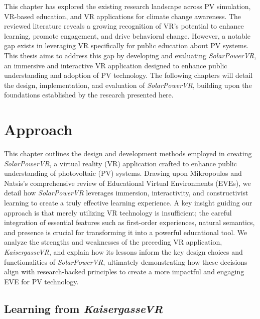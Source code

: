 \documentclass[draft, final]{vutinfth} %
\begin{document}
This chapter has explored the existing research landscape across PV simulation, VR-based education, and VR applications for climate change awareness. The reviewed literature reveals a growing recognition of VR's potential to enhance learning, promote engagement, and drive behavioral change. However, a notable gap exists in leveraging VR specifically for public education about PV systems. This thesis aims to address this gap by developing and evaluating \textit{SolarPowerVR}, an immersive and interactive VR application designed to enhance public understanding and adoption of PV technology. The following chapters will detail the design, implementation, and evaluation of \textit{SolarPowerVR}, building upon the foundations established by the research presented here.

\chapter{Approach}
\label{cpt:approach}

This chapter outlines the design and development methods employed in creating \textit{SolarPowerVR}, a virtual reality (VR) application crafted to enhance public understanding of photovoltaic (PV) systems. Drawing upon Mikropoulos and Natsis's \cite{Mikropoulos2011VrEducational} comprehensive review of Educational Virtual Environments (EVEs), we detail how \textit{SolarPowerVR} leverages immersion, interactivity, and constructivist learning to create a truly effective learning experience. A key insight guiding our approach is that merely utilizing VR technology is insufficient; the careful integration of essential features such as first-order experiences, natural semantics, and presence is crucial for transforming it into a powerful educational tool. We analyze the strengths and weaknesses of the preceding VR application, \textit{KaisergasseVR}, and explain how its lessons inform the key design choices and functionalities of \textit{SolarPowerVR}, ultimately demonstrating how these decisions align with research-backed principles to create a more impactful and engaging EVE for PV technology.

\section{Learning from \textit{KaisergasseVR}}
\end{document}
